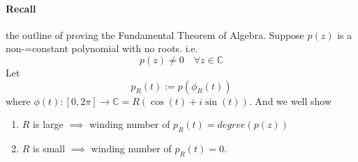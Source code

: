\documentclass[10pt]{article}
\begin{document}
		\paragraph{Recall} the outline of proving the Fundamental Theorem of Algebra. 
		\newline
		Suppose $p(z)$ is a non-=constant polynomial with no roots. i.e.
		\[
			p(z) \neq 0\quad \forall z \in \mathbb{C}
		\]
		Let 
		\[
			p_R(t) := p(\phi_R(t))
		\]
		where $\phi(t): [0, 2\pi] \to \mathbb{C} = R(\cos(t) + i\sin(t))$.
		\newline
		And we well show
		\begin{enumerate}
			\item $R$ is large $\implies$ winding number of $p_R(t) = degree(p(z))$
			\item $R$ is small $\implies$ winding number of $p_R(t) = 0$.
		\end{enumerate}
\end{document}
